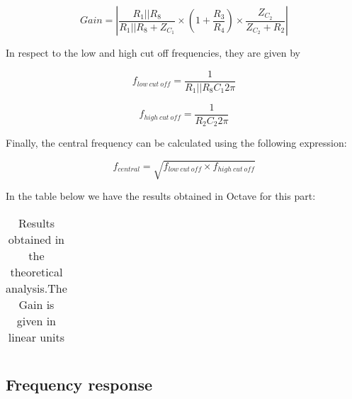 \begin{equation}
Gain = \left| \frac{R_1||R_8}{R_1||R_8 + Z_{C_1}} \times  \left(1+\frac{R_3}{R_4}\right) \times \frac{Z_{C_2}}{Z_{C_2}+R_2} \right|
\end{equation}



In respect to the low and high cut off frequencies, they are given by 

\begin{equation}
f_{low \ cut \ off} = \frac{1}{R_1||R_8 C_1 2 \pi}
\end{equation}

\begin{equation}
f_{high \ cut \ off} = \frac{1}{R_2 C_2 2 \pi}
\end{equation}

Finally, the central frequency can be calculated using the following expression:

\begin{equation}
f_{central} = \sqrt{f_{low \ cut \ off} \times f_{high \ cut \ off}}
\end{equation}

In the table below we have the results obtained in Octave for this part:

\begin{table}[H]
  \centering
  \begin{tabular}{|c|c|}
    \hline
      
  \end{tabular}
  \caption{Results obtained in the theoretical analysis.The Gain is given in linear units}
  \label{tab:results}
\end{table}





\subsection{Frequency response}

